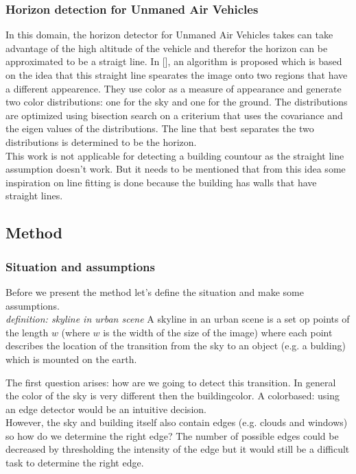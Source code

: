 \subsubsection{Horizon detection for Unmaned Air Vehicles}
In this domain, the horizon detector for Unmaned Air Vehicles takes can take advantage of the high
altitude of the vehicle and therefor the horizon can be approximated to be a
straigt line. 
In [], %
an algorithm is proposed which is based on the idea that this straight line spearates the image
onto two regions that have a different appearence. They use color as a measure
of appearance and generate two color distributions: one for the sky and one
for the ground. The distributions are optimized using bisection search on a criterium that uses the covariance and the eigen values of the distributions. The line that best separates the two distributions is determined to be the horizon.\\
This work is not applicable for detecting a building countour as the
straight line assumption doesn't work. But it needs to be mentioned that from this
idea some inspiration on line fitting is done because the building has walls that have straight lines.










\subsection{Method} %
\subsubsection{Situation and assumptions}
Before we present the method let's define the situation and make some
assumptions.\\

\textit{definition: skyline in urban scene}
A skyline in an urban scene is a set op points of the length $w$ (where $w$ is the
width of the size of the image) where each point describes the location of the
transition from the sky to an object (e.g. a bulding) which is mounted on the earth.

The first question arises: how are we going to detect this transition. In
general the color of the sky is very different then the buildingcolor. A
colorbased: using an edge detector would be an intuitive decision.\\
However, the sky and building itself also contain edges (e.g. clouds and 
windows) so how do we determine the right edge?
The number of possible edges could be decreased by thresholding the intensity of
the edge but it would still be a difficult task to determine the right edge.\\


